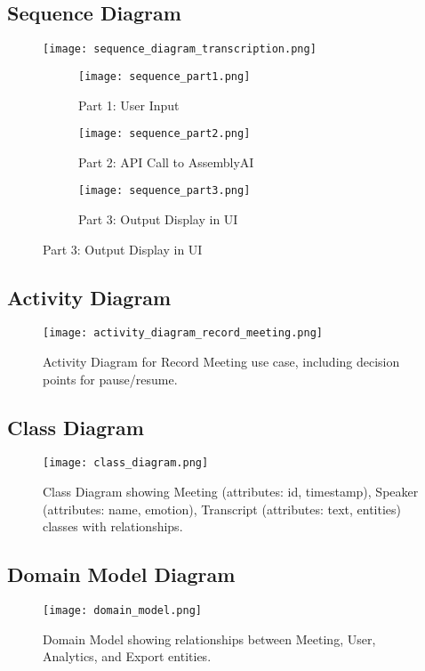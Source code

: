 \documentclass[12pt]{article}
\begin{document}
\subsection{Sequence Diagram}
\begin{figure}[H]
    \centering
    \texttt{[image: sequence\_diagram\_transcription.png]}
    \caption{Sequence Diagram for Transcription Process (complete view).}
    \begin{subfigure}{0.3\textwidth}
        \texttt{[image: sequence\_part1.png]}
        \caption{Part 1: User Input}
    \end{subfigure}
    \begin{subfigure}{0.3\textwidth}
        \texttt{[image: sequence\_part2.png]}
        \caption{Part 2: API Call to AssemblyAI}
    \end{subfigure}
    \begin{subfigure}{0.3\textwidth}
        \texttt{[image: sequence\_part3.png]}
        \caption{Part 3: Output Display in UI}
    \end{subfigure}
\end{figure}

\subsection{Activity Diagram}
\begin{figure}[H]
    \centering
    \texttt{[image: activity\_diagram\_record\_meeting.png]}
    \caption{Activity Diagram for Record Meeting use case, including decision points for pause/resume.}
\end{figure}

\subsection{Class Diagram}
\begin{figure}[H]
    \centering
    \texttt{[image: class\_diagram.png]}
    \caption{Class Diagram showing Meeting (attributes: id, timestamp), Speaker (attributes: name, emotion), Transcript (attributes: text, entities) classes with relationships.}
\end{figure}

\subsection{Domain Model Diagram}
\begin{figure}[H]
    \centering
    \texttt{[image: domain\_model.png]}
    \caption{Domain Model showing relationships between Meeting, User, Analytics, and Export entities.}
\end{figure}
\end{document}
